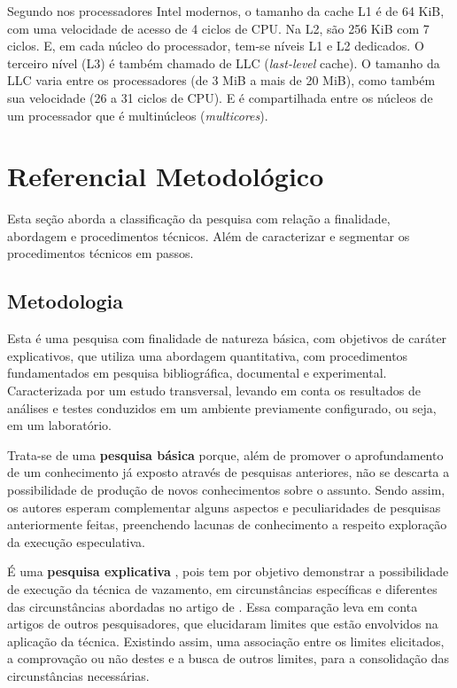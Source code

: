 \documentclass[
	article,			    %
	12pt,				    %
	oneside,			    %
	a4paper,			    %
	chapter=TITLE,		    %
	section=TITLE,		    %
	subsection=TITLE,	    %
	english,			    %
	brazil,				    %
	sumario=tradicional
]{abntex2}
\begin{document}
Segundo  nos processadores Intel modernos, o tamanho da cache L1 é de 64 KiB, com uma velocidade de acesso de 4 ciclos de CPU. Na L2, são 256 KiB com 7 ciclos. E, em cada núcleo do processador, tem-se níveis L1 e L2 dedicados. O terceiro nível (L3) é também chamado de LLC (\emph{last-level} cache). O tamanho da LLC varia entre os processadores (de 3 MiB a mais de 20 MiB), como também sua velocidade (26 a 31 ciclos de CPU). E é compartilhada entre os núcleos de um processador que é multinúcleos (\emph{multicores}).

\section{Referencial Metodológico}
Esta seção aborda a classificação da pesquisa com relação a finalidade, abordagem e procedimentos técnicos. Além de caracterizar e segmentar os procedimentos técnicos em passos.
\subsection{Metodologia}
Esta é uma pesquisa com finalidade de natureza básica, com objetivos de caráter explicativos, que utiliza uma abordagem quantitativa, com procedimentos fundamentados em pesquisa bibliográfica, documental e experimental. Caracterizada por um estudo transversal, levando em conta os resultados de análises e testes conduzidos em um ambiente previamente configurado, ou seja, em um laboratório.

Trata-se de uma \textbf{pesquisa básica} \cite{Priscilla2017Metodologia} porque, além de promover o aprofundamento de um conhecimento já exposto através de pesquisas anteriores, não se descarta a possibilidade de produção de novos conhecimentos sobre o assunto. Sendo assim, os autores esperam complementar alguns aspectos e peculiaridades de pesquisas anteriormente feitas, preenchendo lacunas de conhecimento a respeito exploração da execução especulativa.

É uma \textbf{pesquisa explicativa} \cite{Rocha2016Dom}, pois tem por objetivo demonstrar a possibilidade de execução da técnica de vazamento, em circunstâncias específicas e diferentes das circunstâncias abordadas no artigo de . Essa comparação leva em conta artigos de outros pesquisadores, que elucidaram limites que estão envolvidos na aplicação da técnica. Existindo assim, uma associação entre os limites elicitados, a comprovação ou não destes e a busca de outros limites, para a consolidação das circunstâncias necessárias.
\end{document}
